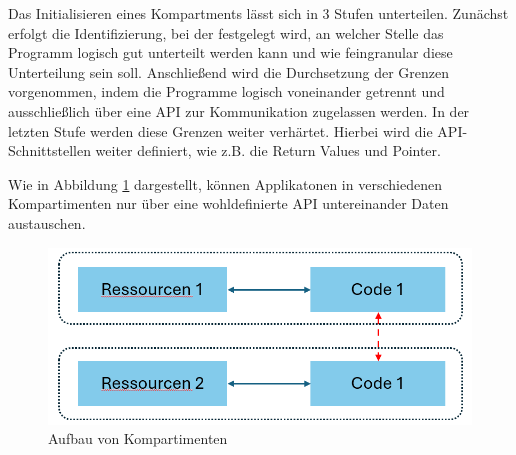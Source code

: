Das Initialisieren eines Kompartments lässt sich in 3 Stufen unterteilen. Zunächst erfolgt die Identifizierung, bei der festgelegt wird, an welcher Stelle das Programm logisch gut unterteilt werden kann und wie feingranular diese Unterteilung sein soll.
Anschließend wird die Durchsetzung der Grenzen vorgenommen, indem die Programme logisch voneinander getrennt und ausschließlich über eine API zur Kommunikation zugelassen werden. 
In der letzten Stufe werden diese Grenzen weiter verhärtet. Hierbei wird die API-Schnittstellen weiter definiert, wie z.B. die Return Values und Pointer.

Wie in Abbildung \ref{fig:Kompartment} dargestellt, können Applikatonen in verschiedenen Kompartimenten nur über eine wohldefinierte API untereinander Daten austauschen.

\begin{figure}[h]
    \centering
    \includegraphics[width=0.8\linewidth]{Grafiken/Kompartiment.png}
    \caption{Aufbau von Kompartimenten}
    \label{fig:Kompartment}
\end{figure}

